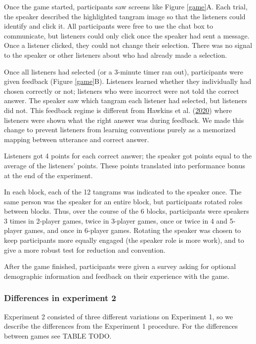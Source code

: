 \documentclass[
  english,
  a4paper,
]{article}
\begin{document}
Once the game started, participants saw screens like Figure \ref{game}A. Each trial, the speaker described the highlighted tangram image so that the listeners could identify and click it. All participants were free to use the chat box to communicate, but listeners could only click once the speaker had sent a message. Once a listener clicked, they could not change their selection. There was no signal to the speaker or other listeners about who had already made a selection.

Once all listeners had selected (or a 3-minute timer ran out), participants were given feedback (Figure \ref{game}B). Listeners learned whether they individually had chosen correctly or not; listeners who were incorrect were not told the correct answer. The speaker saw which tangram each listener had selected, but listeners did not. This feedback regime is different from Hawkins et al. (\protect\hyperlink{ref-hawkinsCharacterizingDynamicsLearning2020}{2020}) where listeners were shown what the right answer was during feedback. We made this change to prevent listeners from learning conventions purely as a memorized mapping between utterance and correct answer.

Listeners got 4 points for each correct answer; the speaker got points equal to the average of the listeners' points. These points translated into performance bonus at the end of the experiment.

In each block, each of the 12 tangrams was indicated to the speaker once. The same person was the speaker for an entire block, but participants rotated roles between blocks. Thus, over the course of the 6 blocks, participants were speakers 3 times in 2-player games, twice in 3-player games, once or twice in 4 and 5-player games, and once in 6-player games. Rotating the speaker was chosen to keep participants more equally engaged (the speaker role is more work), and to give a more robust test for reduction and convention.

After the game finished, participants were given a survey asking for optional demographic information and feedback on their experience with the game.

\hypertarget{differences-in-experiment-2}{%
\subsubsection{Differences in experiment 2}\label{differences-in-experiment-2}}

Experiment 2 consisted of three different variations on Experiment 1, so we describe the differences from the Experiment 1 procedure. For the differences between games see TABLE TODO.
\end{document}
